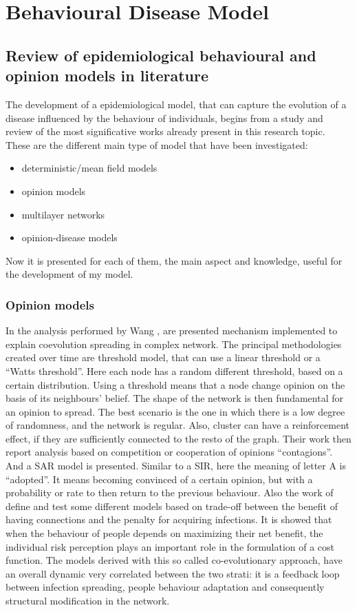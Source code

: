 \part{Behavioural Disease Model}

\chapter{Review of epidemiological behavioural and opinion models in literature}

The development of a epidemiological model, that can capture the evolution of a disease influenced by the behaviour of individuals, begins from a study and review of the most significative works already present in this research topic.
These are the different main type of model that have been investigated:
\begin{itemize}
	\item deterministic/mean field models
	\item opinion models
	\item multilayer networks
	\item opinion-disease models	
\end{itemize}

Now it is presented for each of them, the main aspect and knowledge, useful for the development of my model.   

\section{Opinion models}
In the analysis performed by Wang \cite{Wang_2019}, are presented mechanism implemented to explain coevolution spreading in complex network. The principal methodologies created over time are threshold model, that can use a linear threshold or a “Watts threshold”. Here each node has a random different threshold, based on a certain distribution. Using a threshold means that a node change opinion on the basis of its neighbours’ belief. The shape of the network is then fundamental for an opinion to spread. The best scenario is the one in which there is a low degree of randomness, and the network is regular. Also, cluster can have a reinforcement effect, if they are sufficiently connected to the resto of the graph. Their work then report analysis based on competition or cooperation of opinions “contagions”. And a SAR model is presented. Similar to a SIR, here the meaning of letter A is “adopted”. It means becoming convinced of a certain opinion, but with a probability or rate to then return to the previous behaviour. Also the work of \cite{Nunner2021} define and test some different models based on trade-off between the benefit of having connections and the penalty for acquiring infections. It is showed that when the behaviour of people depends on maximizing their net benefit, the individual risk perception plays an important role in the formulation of a cost function. The models derived with this so called co-evolutionary approach, have an overall dynamic very correlated between the two strati: it is a feedback loop between infection spreading, people behaviour adaptation and consequently structural modification in the network.


